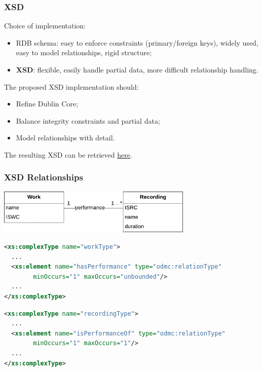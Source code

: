 \documentclass{beamer}
\newcommand\rb[1]{\textcolor{ThemeRed}{\textbf{#1}}}
\begin{document}
  \begin{frame}
    \frametitle{XSD}

    Choice of implementation:

    \vspace{0.5em}

    \begin{itemize}
      \item RDB schema: easy to enforce constraints (primary/foreign keys), widely used, easy to model relationships, rigid structure;
      \item \rb{XSD}: flexible, easily handle partial data, more difficult relationship handling.
    \end{itemize}

    \vspace{1.5em}

    The proposed XSD implementation should:

    \vspace{0.5em}

    \begin{itemize}
      \item Refine Dublin Core;
      \item Balance integrity constraints and partial data;
      \item Model relationships with detail. 
    \end{itemize}

    \vspace{1.5em}

    The resulting XSD can be retrieved \href{https://github.com/pindri/ODMC_exam/blob/master/odmc.xsd}{here}.
  \end{frame}
  
  
  
  \begin{frame}[fragile]
    \frametitle{XSD Relationships}
    
    \begin{center}
      \includegraphics[width=0.7\textwidth]{img/WorkRecording.pdf}
    \end{center}
    
    \lstset{basicstyle=\scriptsize\ttfamily}
\begin{lstlisting}[language=XML]
<xs:complexType name="workType">
  ...
  <xs:element name="hasPerformance" type="odmc:relationType"
        minOccurs="1" maxOccurs="unbounded"/>
  ...
</xs:complexType>
\end{lstlisting}

    \lstset{basicstyle=\scriptsize\ttfamily}
\begin{lstlisting}[language=XML]
<xs:complexType name="recordingType">
  ...
  <xs:element name="isPerformanceOf" type="odmc:relationType"
        minOccurs="1" maxOccurs="1"/>
  ...
</xs:complexType>
\end{lstlisting}

  \end{frame}
\end{document}
